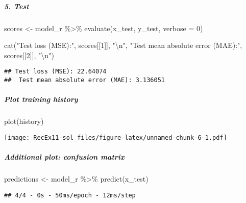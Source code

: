 \documentclass[
]{article}
\newenvironment{Shaded}{\begin{snugshade}}{\end{snugshade}}
\newcommand{\AttributeTok}[1]{\textcolor[rgb]{0.77,0.63,0.00}{#1}}
\newcommand{\DecValTok}[1]{\textcolor[rgb]{0.00,0.00,0.81}{#1}}
\newcommand{\FunctionTok}[1]{\textcolor[rgb]{0.00,0.00,0.00}{#1}}
\newcommand{\NormalTok}[1]{#1}
\newcommand{\OtherTok}[1]{\textcolor[rgb]{0.56,0.35,0.01}{#1}}
\newcommand{\SpecialCharTok}[1]{\textcolor[rgb]{0.00,0.00,0.00}{#1}}
\newcommand{\StringTok}[1]{\textcolor[rgb]{0.31,0.60,0.02}{#1}}
\begin{document}
\hypertarget{test}{%
\subparagraph{5. Test}\label{test}}

\begin{Shaded}
\begin{Highlighting}[]
\NormalTok{scores }\OtherTok{\textless{}{-}}\NormalTok{ model\_r }\SpecialCharTok{\%\textgreater{}\%} \FunctionTok{evaluate}\NormalTok{(x\_test, y\_test, }\AttributeTok{verbose =} \DecValTok{0}\NormalTok{)}

\FunctionTok{cat}\NormalTok{(}\StringTok{"Test loss (MSE):"}\NormalTok{, scores[[}\DecValTok{1}\NormalTok{]], }\StringTok{"}\SpecialCharTok{\textbackslash{}n}\StringTok{"}\NormalTok{,}
    \StringTok{"Test mean absolute error (MAE):"}\NormalTok{, scores[[}\DecValTok{2}\NormalTok{]], }\StringTok{"}\SpecialCharTok{\textbackslash{}n}\StringTok{"}\NormalTok{)}
\end{Highlighting}
\end{Shaded}

\begin{verbatim}
## Test loss (MSE): 22.64074 
##  Test mean absolute error (MAE): 3.136051
\end{verbatim}

\hypertarget{plot-training-history}{%
\subparagraph{Plot training history}\label{plot-training-history}}

\begin{Shaded}
\begin{Highlighting}[]
\FunctionTok{plot}\NormalTok{(history)}
\end{Highlighting}
\end{Shaded}

\texttt{[image: RecEx11-sol\_files/figure-latex/unnamed-chunk-6-1.pdf]}

\hypertarget{additional-plot-confusion-matrix}{%
\subparagraph{Additional plot: confusion
matrix}\label{additional-plot-confusion-matrix}}

\begin{Shaded}
\begin{Highlighting}[]
\NormalTok{predictions }\OtherTok{\textless{}{-}}\NormalTok{ model\_r }\SpecialCharTok{\%\textgreater{}\%} \FunctionTok{predict}\NormalTok{(x\_test)}
\end{Highlighting}
\end{Shaded}

\begin{verbatim}
## 4/4 - 0s - 50ms/epoch - 12ms/step
\end{verbatim}
\end{document}
